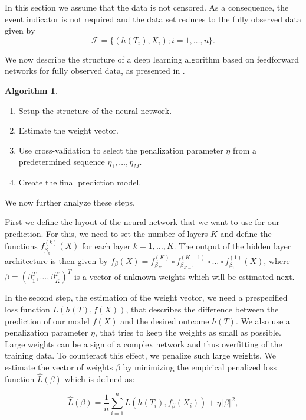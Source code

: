 \documentclass[12pt, a4paper]{scrartcl}
\theoremstyle{definition}
\newtheorem{Algorithm}{Algorithm}[section]
\theoremstyle{plain}
\numberwithin{equation}{section}
\numberwithin{figure}{section}
\numberwithin{table}{section}
\begin{document}
	In this section we assume that the data is not censored.
	As a consequence, the event indicator is not required and the data set reduces to the fully observed data given by
	\begin{equation*}
	\mathcal{F} =\{ \left( h(T_i), X_i\right); i = 1, \dots, n\}.
	\end{equation*}
	
	We now describe the structure of a deep learning algorithm based on feedforward networks for fully observed data, as presented in \citet*{basearticle}.
	
	\begin{Algorithm}\label{alg:nocensor}
		~
	\begin{enumerate}
		\item Setup the structure of the neural network.
		\item Estimate the weight vector.
		\item Use cross-validation to select the penalization parameter $\eta$ from a predetermined sequence $\eta_1,\dots,\eta_M$.
		\item Create the final prediction model.
	\end{enumerate}
	\end{Algorithm}

	We now further analyze these steps.

	First we define the layout of the neural network that we want to use for our prediction.
	For this, we need to set the number of layers $K$ and define the functions $f_{\beta_k}^{(k)}(X)$ for each layer $k = 1, \dots, K$.
	The output of the hidden layer architecture is then given by $f_{\beta}(X) = f_{\beta_K}^{(K)} \circ f_{\beta_{K-1}}^{(K-1)} \circ \dots \circ f_{\beta_1}^{(1)}(X)$, where $\beta = (\beta_1^T, \dots, \beta_K^T)^T$ is a vector of unknown weights which will be estimated next.
	
	In the second step, the estimation of the weight vector, we need a prespecified loss function $L(h(T), f(X))$, that describes the difference between the prediction of our model $f(X)$ and the desired outcome $h(T)$.
	We also use a penalization parameter $\eta$, that tries to keep the weights as small as possible.
	Large weights can be a sign of a complex network and thus overfitting of the training data.
	To counteract this effect, we penalize such large weights.
	We estimate the vector of weights $\beta$ by minimizing the empirical penalized loss function $\hat{L}(\beta)$ which is defined as:
	
	\begin{equation}\label{eq:eplf}
	\hat{L}(\beta) = \frac{1}{n} \sum_{i=1}^n L( h(T_i), f_{\beta}(X_i)) + \eta \Vert \beta \Vert ^2,
	\end{equation}
	
\end{document}
